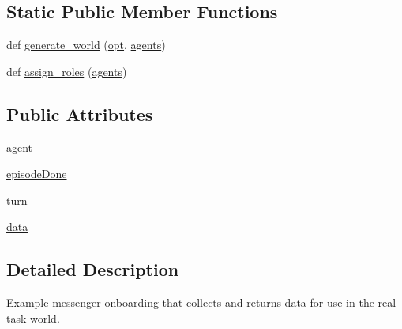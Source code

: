 \subsection*{Static Public Member Functions}
\begin{DoxyCompactItemize}
\item 
def \hyperlink{classparlai_1_1chat__service_1_1tasks_1_1overworld__demo_1_1worlds_1_1MessengerOnboardDataOnboardWorld_ab6fc62103c70beb33e9db11e4f6e7b4c}{generate\+\_\+world} (\hyperlink{classparlai_1_1core_1_1worlds_1_1World_a3640d92718acd3e6942a28c1ab3678bd}{opt}, \hyperlink{classparlai_1_1core_1_1worlds_1_1World_a728f75194cc26ea4035047c46cf62608}{agents})
\item 
def \hyperlink{classparlai_1_1chat__service_1_1tasks_1_1overworld__demo_1_1worlds_1_1MessengerOnboardDataOnboardWorld_a2b6f4db53d6423562de32ea77eb7a2ac}{assign\+\_\+roles} (\hyperlink{classparlai_1_1core_1_1worlds_1_1World_a728f75194cc26ea4035047c46cf62608}{agents})
\end{DoxyCompactItemize}
\subsection*{Public Attributes}
\begin{DoxyCompactItemize}
\item 
\hyperlink{classparlai_1_1chat__service_1_1tasks_1_1overworld__demo_1_1worlds_1_1MessengerOnboardDataOnboardWorld_af0fb55796b4297b23a3f854b2cf07238}{agent}
\item 
\hyperlink{classparlai_1_1chat__service_1_1tasks_1_1overworld__demo_1_1worlds_1_1MessengerOnboardDataOnboardWorld_af7d45c1d266f15c3648c380be8c3e3bf}{episode\+Done}
\item 
\hyperlink{classparlai_1_1chat__service_1_1tasks_1_1overworld__demo_1_1worlds_1_1MessengerOnboardDataOnboardWorld_a75f4b93eabd0944f540fcfdf3271f8c9}{turn}
\item 
\hyperlink{classparlai_1_1chat__service_1_1tasks_1_1overworld__demo_1_1worlds_1_1MessengerOnboardDataOnboardWorld_a93ef45b3ba0fa68b8453f8e19252e1e2}{data}
\end{DoxyCompactItemize}


\subsection{Detailed Description}
\begin{DoxyVerb}Example messenger onboarding that collects and returns data for use in the real task
world.
\end{DoxyVerb}
 

